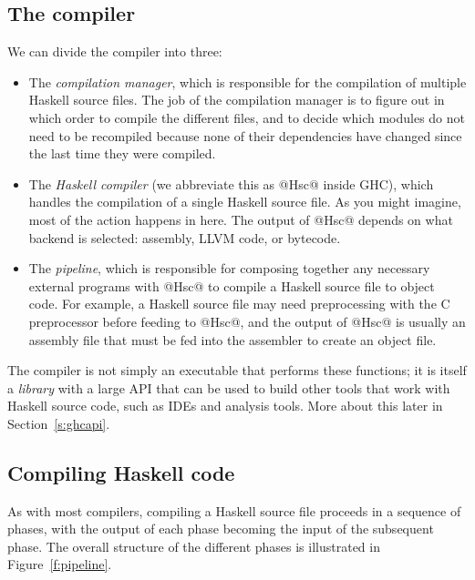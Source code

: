 \documentclass{article}
\begin{document}
\subsection{The compiler}

We can divide the compiler into three:

\begin{itemize}
\item The \emph{compilation manager}, which is responsible for the
  compilation of multiple Haskell source files.  The job of the
  compilation manager is to figure out in which order to compile the
  different files, and to decide which modules do not need to be
  recompiled because none of their dependencies have changed since the
  last time they were compiled.

\item The \emph{Haskell compiler} (we abbreviate this as @Hsc@ inside
  GHC), which handles the compilation of a single Haskell source file.
  As you might imagine, most of the action happens in here.  The
  output of @Hsc@ depends on what backend is selected: assembly,
  LLVM code, or bytecode.

\item The \emph{pipeline}, which is responsible for composing together
  any necessary external programs with @Hsc@ to compile a Haskell
  source file to object code.  For example, a Haskell source file may
  need preprocessing with the C preprocessor before feeding to @Hsc@,
  and the output of @Hsc@ is usually an assembly file that must be fed
  into the assembler to create an object file.
\end{itemize}

The compiler is not simply an executable that performs these
functions; it is itself a \emph{library} with a large API that can be
used to build other tools that work with Haskell source code, such as
IDEs and analysis tools.  More about this later in
Section~\ref{s:ghcapi}.

\subsection{Compiling Haskell code}

As with most compilers, compiling a Haskell source file proceeds in a
sequence of phases, with the output of each phase becoming the input
of the subsequent phase.  The overall structure of the different
phases is illustrated in Figure~\ref{f:pipeline}.
\end{document}
